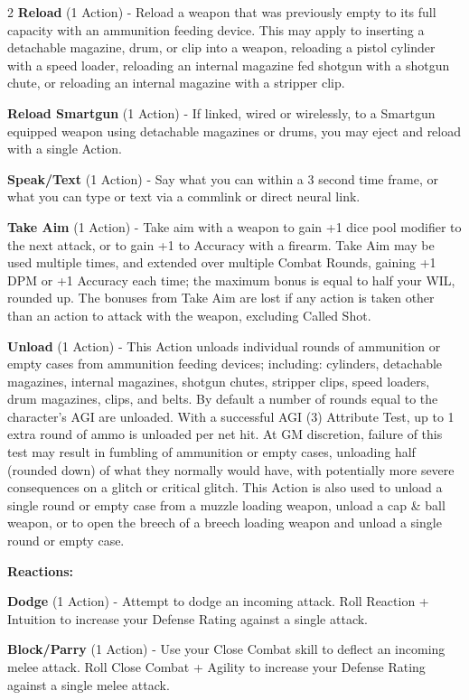 \documentclass[
  oneside]{article}
\begin{document}
\begin{multicols}{2}
\textbf{Reload} (1 Action) - Reload a weapon that
was previously empty to its full capacity with an
ammunition feeding device. This may apply to
inserting a detachable magazine, drum, or clip
into a weapon, reloading a pistol cylinder with a
speed loader, reloading an internal magazine fed
shotgun with a shotgun chute, or reloading an
internal magazine with a stripper clip.

\textbf{Reload Smartgun} (1 Action) - If linked,
wired or wirelessly, to a Smartgun equipped weapon
using detachable magazines or drums, you may eject
and reload with a single Action.

\textbf{Speak/Text} (1 Action) - Say what you can
within a 3 second time frame, or what you can type
or text via a commlink or direct neural link.

\textbf{Take Aim} (1 Action) - Take aim with a
weapon to gain +1 dice pool modifier to the next
attack, or to gain +1 to Accuracy with a firearm.
Take Aim may be used multiple times, and extended
over multiple Combat Rounds, gaining +1 DPM or +1
Accuracy each time; the maximum bonus is equal to
half your WIL, rounded up. The bonuses from Take
Aim are lost if any action is taken other than an
action to attack with the weapon, excluding Called
Shot.

\textbf{Unload} (1 Action) - This Action unloads
individual rounds of ammunition or empty cases
from ammunition feeding devices; including:
cylinders, detachable magazines, internal
magazines, shotgun chutes, stripper clips, speed
loaders, drum magazines, clips, and belts. By
default a number of rounds equal to the
character's AGI are unloaded. With a successful
AGI (3) Attribute Test, up to 1 extra round of
ammo is unloaded per net hit. At GM discretion,
failure of this test may result in fumbling of
ammunition or empty cases, unloading half (rounded
down) of what they normally would have, with
potentially more severe consequences on a glitch
or critical glitch. This Action is also used to
unload a single round or empty case from a muzzle
loading weapon, unload a cap \& ball weapon, or to
open the breech of a breech loading weapon and
unload a single round or empty case.

\textbf{Reactions:}

\textbf{Dodge} (1 Action) - Attempt to dodge an
incoming attack. Roll Reaction + Intuition to
increase your Defense Rating against a single
attack.

\textbf{Block/Parry} (1 Action) - Use your Close
Combat skill to deflect an incoming melee attack.
Roll Close Combat + Agility to increase your
Defense Rating against a single melee attack.


\end{multicols}
\end{document}
